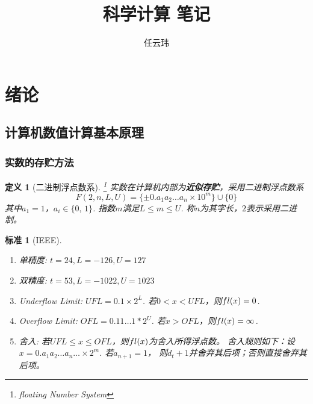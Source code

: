 \documentclass[12pt, a4paper]{article}
\title{科学计算 笔记}
\author{任云玮}
\date{}
\theoremstyle{margin}
\newtheorem{defi}[thm]{定义}
\newtheorem{std}[thm]{标准}
\newcommand{\tbf}{\textbf}
\newcommand{\fl}{\mathnormal{fl}}
\newcommand{\aoneton}{a_1a_2\dots a_n}
\begin{document}
\maketitle
\tableofcontents
\newpage

\section{绪论}

\subsection{计算机数值计算基本原理}

\subsubsection{实数的存贮方法}
  \begin{defi}[二进制浮点数系]\footnote{floating Number System}
    实数在计算机内部为\tbf{近似存贮}，采用二进制浮点数系
    \[
      F(2,n,L,U)=\{\pm0.\aoneton\times10^m\}\cup\{0\}
    \]
    其中$a_1=1$，$a_i\in\{0,\,1\}$. 指数$m$满足$L\le m\le U$.
    称$n$为其字长，$2$表示采用二进制。
  \end{defi}

  \begin{std}[IEEE]
    $\,$
    \begin{enumerate}
      \item 单精度: $t=24,L=-126,U=127$
      \item 双精度: $t=53,L=-1022,U=1023$
      \item Underflow Limit: $UFL=0.1\times2^L$.
      若$0<x<UFL$，则$\\fl(x)=0$.
      \item Overflow Limit: $OFL=0.11\dots1*2^U$.
      若$x>OFL$，则$\fl(x)=\infty$.
      \item 舍入: 若$UFL\le x\le OFL$，则$\fl(x)$为舍入所得浮点数。
      舍入规则如下：设$x=0.\aoneton\dots\times2^m$. 若$a_{n+1}=1$，
      则$d_t+1$并舍弃其后项；否则直接舍弃其后项。
    \end{enumerate}
  \end{std}
\end{document}

